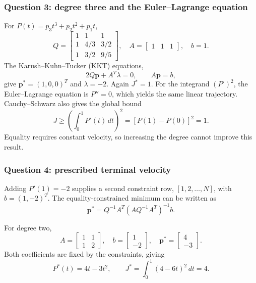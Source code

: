 \documentclass[12pt,a4paper,twoside]{article}
\begin{document}
\subsubsection{Question 3: degree three and the Euler--Lagrange equation}
For $P(t)=p_3t^3+p_2t^2+p_1t$,
\begin{equation}
Q=\begin{bmatrix}1&1&1\\1&4/3&3/2\\1&3/2&9/5\end{bmatrix},\quad
A=\begin{bmatrix}1&1&1\end{bmatrix},\quad b=1.
\end{equation}
The Karush--Kuhn--Tucker (KKT) equations,
\begin{equation}
2Q\boldsymbol p+A^T\lambda=0,\qquad A\boldsymbol p=b,
\end{equation}
give $\boldsymbol p^*=(1,0,0)^T$ and $\lambda=-2$. Again $J^*=1$.
For the integrand $(P')^2$, the Euler--Lagrange equation is $P''=0$,
which yields the same linear trajectory. Cauchy--Schwarz also gives the global bound
\begin{equation}
J\geq\left(\int_0^1P'(t)\,dt\right)^2=[P(1)-P(0)]^2=1.
\end{equation}
Equality requires constant velocity, so increasing the degree cannot improve this result.

\subsubsection{Question 4: prescribed terminal velocity}
Adding $P'(1)=-2$ supplies a second constraint row, $[1,2,\ldots,N]$,
with $b=(1,-2)^T$. The equality-constrained minimum can be written as
\begin{equation}
\boldsymbol p^*=Q^{-1}A^T(AQ^{-1}A^T)^{-1}b.
\end{equation}

For degree two,
\begin{equation}
A=\begin{bmatrix}1&1\\1&2\end{bmatrix},\quad
b=\begin{bmatrix}1\\-2\end{bmatrix},\quad
\boldsymbol p^*=\begin{bmatrix}4\\-3\end{bmatrix}.
\end{equation}
Both coefficients are fixed by the constraints, giving
\begin{equation}
\boxed{P^*(t)=4t-3t^2,\qquad J^*=\int_0^1(4-6t)^2\,dt=4.}
\end{equation}
\end{document}
